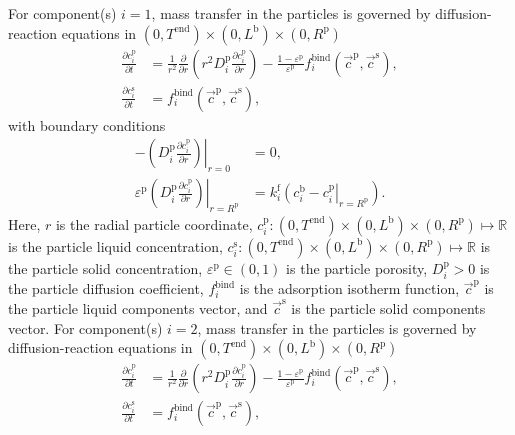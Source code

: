 \documentclass{article}
\begin{document}
For component(s) $i = 1$, mass transfer in the particles is governed by diffusion-reaction equations in $(0, T^{\mathrm{end}}) \times (0, L^{\mathrm{b}})\times (0, R^{\mathrm{p}})$
\begin{align}
    \frac{\partial c^{\mathrm{p}}_{i}}{\partial t}
    &= \frac{1}{r^{2}} \frac{\partial }{\partial r} \left( r^{2} D^{\mathrm{p}}_{i} \frac{\partial c^{\mathrm{p}}_{i}}{\partial r} \right)
        - \frac{1 - \varepsilon^{\mathrm{p}}}{\varepsilon^{\mathrm{p}}}f^{\mathrm{bind}}_{i}\left( \vec{c}^{\mathrm{p}}, \vec{c}^{\mathrm{s}} \right),
    \\
    \frac{\partial c^{\mathrm{s}}_{i}}{\partial t}
    &= f^{\mathrm{bind}}_{i}\left( \vec{c}^{\mathrm{p}}, \vec{c}^{\mathrm{s}} \right),
\end{align}
with boundary conditions
\begin{align}
    - \left. \left( D^{\mathrm{p}}_{i} \frac{\partial c^{\mathrm{p}}_{i}}{\partial r} \right) \right|_{r=0}
    &= 0,
    \\
    \varepsilon^{\mathrm{p}} \left. \left( D^{\mathrm{p}}_{i} \frac{\partial c^{\mathrm{p}}_{i}}{\partial r} \right)\right|_{r = R^{\mathrm{p}}}
    &= k^{\mathrm{f}}_{i} \left. \left( c^{\mathrm{b}}_{i} - c^{\mathrm{p}}_{i} \right|_{r = R^{\mathrm{p}}} \right).
\end{align}
Here, $r$ is the radial particle coordinate, $c^{\mathrm{p}}_{i}\colon (0, T^{\mathrm{end}}) \times (0, L^{\mathrm{b}})\times (0, R^{\mathrm{p}}) \mapsto \mathbb{R}$ is the particle liquid concentration, $c^{\mathrm{s}}_{i}\colon (0, T^{\mathrm{end}}) \times (0, L^{\mathrm{b}})\times (0, R^{\mathrm{p}}) \mapsto \mathbb{R}$ is the particle solid concentration, $\varepsilon^{\mathrm{p}}\in (0, 1)$ is the particle porosity, $D^{\mathrm{p}}_{i}> 0$ is the particle diffusion coefficient, $f^{\mathrm{bind}}_{i}$ is the adsorption isotherm function, $\vec{c}^{\mathrm{p}}$ is the particle liquid components vector, and $\vec{c}^{\mathrm{s}}$ is the particle solid components vector.
For component(s) $i = 2$, mass transfer in the particles is governed by diffusion-reaction equations in $(0, T^{\mathrm{end}}) \times (0, L^{\mathrm{b}})\times (0, R^{\mathrm{p}})$
\begin{align}
    \frac{\partial c^{\mathrm{p}}_{i}}{\partial t}
    &= \frac{1}{r^{2}} \frac{\partial }{\partial r} \left( r^{2} D^{\mathrm{p}}_{i} \frac{\partial c^{\mathrm{p}}_{i}}{\partial r} \right)
        - \frac{1 - \varepsilon^{\mathrm{p}}}{\varepsilon^{\mathrm{p}}}f^{\mathrm{bind}}_{i}\left( \vec{c}^{\mathrm{p}}, \vec{c}^{\mathrm{s}} \right),
    \\
    \frac{\partial c^{\mathrm{s}}_{i}}{\partial t}
    &= f^{\mathrm{bind}}_{i}\left( \vec{c}^{\mathrm{p}}, \vec{c}^{\mathrm{s}} \right),
\end{align}
\end{document}
